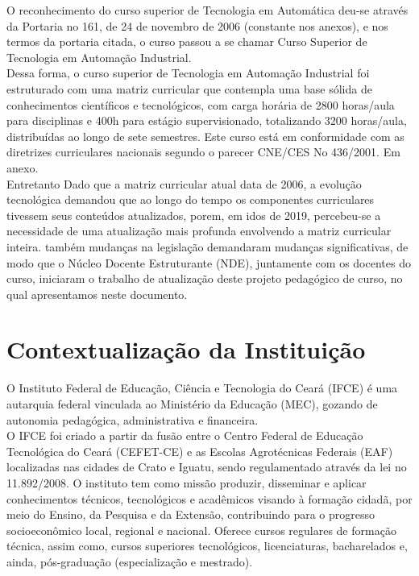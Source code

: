 O reconhecimento do curso superior de Tecnologia em Automática deu-se através da Portaria no 161, de 24 de novembro de 2006 (constante nos anexos), e nos termos da portaria citada, o curso passou a se chamar Curso Superior de Tecnologia em Automação Industrial.\\

Dessa forma, o curso superior de Tecnologia em Automação Industrial foi estruturado com uma matriz curricular que contempla uma base sólida de conhecimentos científicos e tecnológicos, com carga horária de 2800 horas/aula para disciplinas e 400h para estágio supervisionado, totalizando 3200 horas/aula, distribuídas ao longo de sete semestres. Este curso está em conformidade com as diretrizes curriculares nacionais segundo o parecer CNE/CES No 436/2001. Em anexo.\\

Entretanto Dado que a matriz curricular atual data de 2006, a evolução tecnológica demandou que ao longo do tempo os componentes curriculares tivessem seus conteúdos atualizados, porem, em idos de 2019, percebeu-se a necessidade de uma atualização mais profunda envolvendo a matriz curricular inteira. também mudanças na legislação demandaram mudanças significativas, de modo que o Núcleo Docente Estruturante (NDE), juntamente com os docentes do curso, iniciaram o trabalho de atualização deste projeto pedagógico de curso, no qual apresentamos neste documento.

\chapter{Contextualização da Instituição}
 
O Instituto Federal de Educação, Ciência e Tecnologia do Ceará (IFCE) é uma autarquia federal vinculada ao Ministério da Educação (MEC), gozando de autonomia pedagógica, administrativa e financeira.\\

O IFCE foi criado a partir da fusão entre o Centro Federal de Educação Tecnológica do Ceará (CEFET-CE) e as Escolas Agrotécnicas Federais (EAF) localizadas nas cidades de Crato e Iguatu, sendo regulamentado através da lei no 11.892/2008. O instituto tem como missão produzir, disseminar e aplicar conhecimentos técnicos, tecnológicos e acadêmicos visando à formação cidadã, por meio do Ensino, da Pesquisa e da Extensão, contribuindo para o progresso socioeconômico local, regional e nacional. Oferece cursos regulares de formação técnica, assim como, cursos superiores tecnológicos, licenciaturas, bacharelados e, ainda, pós-graduação (especialização e mestrado).\\

